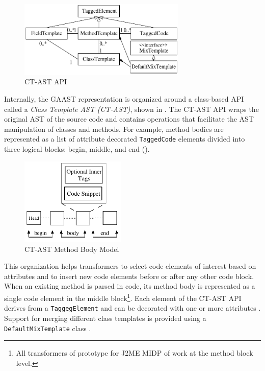 \begin{figure}[ht]
	\begin{center}
		\includegraphics[width=8cm,height=!]{ch05/ct-ast2}
	\end{center}
	\caption{CT-AST API}
	\label{fig:ct-ast}
\end{figure}

Internally, the GAAST representation is organized around a class-based API called a \textit{Class Template AST (CT-AST)}, shown in . The CT-AST API wraps the original AST of the source code  and contains operations that facilitate the AST manipulation of classes and methods. For example, method bodies are represented as a list of attribute decorated \texttt{TaggedCode} elements divided into three logical blocks: begin, middle, and end ().

\begin{figure}[ht]
	\begin{center}
		\includegraphics[width=5cm,height=!]{ch05/method-body2}
	\end{center}
	\caption{CT-AST Method Body Model}
	\label{fig:method-body2}
\end{figure}

This organization helps transformers to select code elements of interest based on attributes and to insert new code elements before or after any other code block. When an existing method is parsed in code, its method body is represented as a single code element in the middle block\footnote{All transformers of prototype for J2ME MIDP of  work at the method block level.}. Each element of the CT-AST API derives from a {\tt Taggeg\-Ele\-ment} and can be decorated with one or more attributes . Support for merging different class templates is provided using a {\tt De\-fault\-Mix\-Tem\-pla\-te} class .

